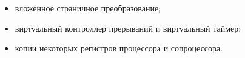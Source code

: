 \begin{itemize}
    \item вложенное страничное преобразование;
    \item виртуальный контроллер прерываний и виртуальный таймер;
    \item копии некоторых регистров процессора и сопроцессора.
\end{itemize}
